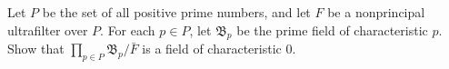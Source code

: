 Let $P$ be the set of all positive prime numbers, and let $F$ be a nonprincipal ultrafilter over $P$. For each $p \in P$, let $\mathfrak{B}_p$ be the prime field of characteristic $p$. Show that $\prod_{p \in P} \mathfrak{B}_p / \bar{F}$ is a field of characteristic $0$.
